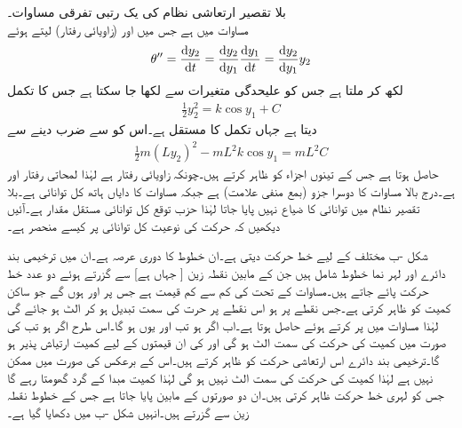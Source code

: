 \quad بلا تقصیر ارتعاشی نظام کی یک رتبی تفرقی مساوات۔\\
مساوات  میں  ہے جس میں  اور   (زاویائی رفتار) لیتے ہوئے
\begin{align*}
\theta''=\frac{\dif y_2}{\dif t}=\frac{\dif y_2}{\dif y_1}\frac{\dif y_1}{\dif t}=\frac{\dif y_2}{\dif y_1}y_2
\end{align*}
لکھ کر  ملتا ہے جس کو علیحدگی متغیرات سے  لکھا جا سکتا ہے جس کا تکمل
\begin{align}\label{مساوات_نظام_کل_توانائی_الف}
\frac{1}{2}y_2^2=k\cos y_1+C 
\end{align}
دیتا ہے جہاں  تکمل کا مستقل ہے۔اس کو  سے ضرب دینے سے
\begin{align*}
\frac{1}{2}m(Ly_2)^2-mL^2k\cos y_1=mL^2C
\end{align*}
حاصل ہوتا ہے جس کے تینوں اجزاء  کو ظاہر کرتے ہیں۔چونکہ  زاویائی رفتار ہے لہٰذا  لمحاتی رفتار اور    ہے۔درج بالا مساوات کا دوسرا جزو (بمع منفی علامت)  ہے جبکہ مساوات کا دایاں ہاتھ  کل توانائی ہے۔بلا تقصیر نظام میں توانائی کا ضیاع نہیں پایا جاتا لہٰذا حزب توقع کل توانائی مستقل مقدار ہے۔آئیں دیکھیں کہ حرکت کی نوعیت کل توانائی پر کیسے منحصر ہے۔

شکل -ب مختلف  کے لیے خط حرکت دیتی ہے۔ان خطوط کا دوری عرصہ  ہے۔ان میں ترخیمی بند دائرے اور  لہر نما خطوط شامل ہیں جن کے مابین نقطہ زین [ جہاں  ہے] سے گزرتے ہوئے دو عدد خط حرکت  پائے جاتے ہیں۔مساوات  کے تحت  کی کم سے کم قیمت  ہے جس پر  اور  ہوں گے جو ساکن کمیت کو ظاہر کرتی ہے۔جس نقطے پر  ہو اس نقطے پر حرت کی سمت تبدیل ہو کر الٹ ہو جائے گی لہٰذا مساوات  میں  پر کرتے ہوئے  حاصل ہوتا ہے۔اب اگر  ہو تب  اور یوں  ہو گا۔اس طرح اگر  ہو تب  کی صورت میں کمیت کی حرکت کی سمت الٹ ہو گی اور  کی ان قیمتوں  کے لیے کمیت ارتیاش پذیر ہو گا۔ترخیمی بند دائرے اس ارتعاشی حرکت کو ظاہر کرتے ہیں۔اس کے برعکس  کی صورت میں  ممکن نہیں ہے لہٰذا کمیت کی حرکت کی سمت الٹ نہیں ہو گی لہٰذا کمیت مبدا  کے گرد گھومتا رہے گا جس کو لہری خط حرکت ظاہر کرتی ہیں۔ان دو صورتوں کے مابین  پایا جاتا ہے جس کے خطوط نقطہ زین  سے گزرتے ہیں۔انہیں شکل -ب  میں دکھایا گیا ہے۔

